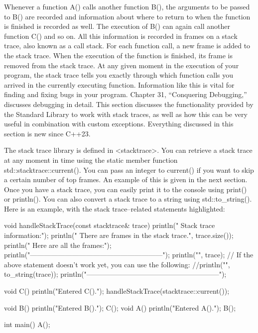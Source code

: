 

Whenever a function A() calls another function B(), the arguments to be passed to B() are recorded and information about where to return to when the function is finished is recorded as well. The execution of B() can again call another function C() and so on. All this information is recorded in frames on a stack trace, also known as a call stack. For each function call, a new frame is added to the stack trace. When the execution of the function is finished, its frame is removed from the stack trace. At any given moment in the execution of your program, the stack trace tells you exactly through which function calls you arrived in the currently executing function. Information like this is vital for finding and fixing bugs in your program. Chapter 31, “Conquering Debugging,” discusses debugging in detail. This section discusses the functionality provided by the Standard Library to work with stack traces, as well as how this can be very useful in combination with custom exceptions. Everything discussed in this section is new since C++23.


The stack trace library is defined in <stacktrace>. You can retrieve a stack trace at any moment in time using the static member function std::stacktrace::current(). You can pass an integer to current() if you want to skip a certain number of top frames. An example of this is given in the next section. Once you have a stack trace, you can easily print it to the console using print() or println(). You can also convert a stack trace to a string using std::to\_string(). Here is an example, with the stack trace–related statements highlighted:

\begin{cpp}
void handleStackTrace(const stacktrace& trace)
{
    println(" Stack trace information:");
    println("   There are {} frames in the stack trace.", trace.size());
    println("   Here are all the frames:");
    println("---------------------------------------------------------");
    println("{}", trace);
    // If the above statement doesn't work yet, you can use the following:
    //println("{}", to_string(trace));
    println("---------------------------------------------------------");
}

void C()
{
    println("Entered C().");
    handleStackTrace(stacktrace::current());
}

void B() { println("Entered B()."); C(); }
void A() { println("Entered A()."); B(); }

int main()
{
    A();
}
\end{cpp}

